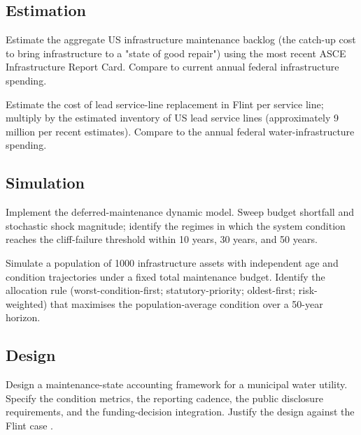 \subsection*{Estimation}

\begin{exercise}
Estimate the aggregate US infrastructure maintenance backlog (the catch-up cost to bring infrastructure to a "state of good repair") using the most recent ASCE Infrastructure Report Card. Compare to current annual federal infrastructure spending.
\end{exercise}

\begin{exercise}
Estimate the cost of lead service-line replacement in Flint per service line; multiply by the estimated inventory of US lead service lines (approximately 9 million per recent estimates). Compare to the annual federal water-infrastructure spending.
\end{exercise}

\subsection*{Simulation}

\begin{exercise}
Implement the deferred-maintenance dynamic model. Sweep budget shortfall and stochastic shock magnitude; identify the regimes in which the system condition reaches the cliff-failure threshold within 10 years, 30 years, and 50 years.
\end{exercise}

\begin{exercise}
Simulate a population of 1000 infrastructure assets with independent age and condition trajectories under a fixed total maintenance budget. Identify the allocation rule (worst-condition-first; statutory-priority; oldest-first; risk-weighted) that maximises the population-average condition over a 50-year horizon.
\end{exercise}

\subsection*{Design}

\begin{exercise}
Design a maintenance-state accounting framework for a municipal water utility. Specify the condition metrics, the reporting cadence, the public disclosure requirements, and the funding-decision integration. Justify the design against the Flint case \cite{acc:fwatf-2016}.
\end{exercise}

